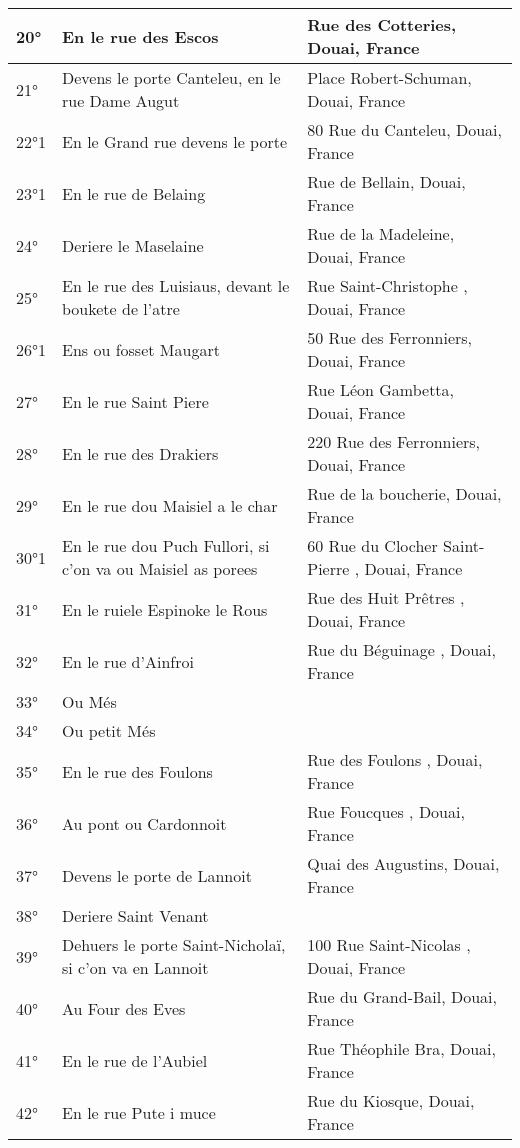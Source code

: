 \begin{center}
\begin{longtable}{|l|p{6.5cm}|p{6.5cm}|}
\hline	20°	&	En le rue des Escos	&	 Rue des Cotteries, Douai, France	\\
\hline	21°	&	Devens le porte Canteleu, en le rue Dame Augut	&	 Place Robert-Schuman, Douai, France	\\
\hline	22°1	&	En le Grand rue devens le porte	&	 80 Rue du Canteleu, Douai, France	\\
\hline	23°1	&	En le rue de Belaing	&	 Rue de Bellain, Douai, France	\\
\hline	24°	&	Deriere le Maselaine	&	 Rue de la Madeleine, Douai, France	\\
\hline	25°	&	En le rue des Luisiaus, devant le boukete de l'atre	&	Rue Saint-Christophe , Douai, France	\\
\hline	26°1	&	Ens ou fosset Maugart	&	 50 Rue des Ferronniers, Douai, France	\\
\hline	27°	&	En le rue Saint Piere	&	 Rue Léon Gambetta, Douai, France	\\
\hline	28°	&	En le rue des Drakiers	&	 220 Rue des Ferronniers, Douai, France	\\
\hline	29°	&	En le rue dou Maisiel a le char	&	 Rue de la boucherie, Douai, France	\\
\hline	30°1	&	En le rue dou Puch Fullori, si c'on va ou Maisiel as porees	&	 60 Rue du Clocher Saint-Pierre , Douai, France	\\
\hline	31°	&	En le ruiele Espinoke le Rous	&	Rue des Huit Prêtres , Douai, France	\\
\hline	32°	&	En le rue d'Ainfroi	&	Rue du Béguinage , Douai, France	\\
\hline	33°	&	Ou Més	&		\\
\hline	34°	&	Ou petit Més	&		\\
\hline	35°	&	En le rue des Foulons	&	Rue des Foulons , Douai, France	\\
\hline	36°	&	Au pont ou Cardonnoit	&	Rue Foucques , Douai, France	\\
\hline	37°	&	Devens le porte de Lannoit	&	 Quai des Augustins, Douai, France	\\
\hline	38°	&	Deriere Saint Venant	&		\\
\hline	39°	&	Dehuers le porte Saint-Nicholaï, si c'on va en Lannoit	&	100 Rue  Saint-Nicolas , Douai, France	\\
\hline	40°	&	Au Four des Eves 	&	Rue du Grand-Bail, Douai, France	\\
\hline	41°	&	En le rue de l'Aubiel	&	 Rue Théophile Bra, Douai, France	\\
\hline	42°	&	En le rue Pute i muce	&	 Rue du Kiosque, Douai, France	\\

\end{longtable}
\end{center}
